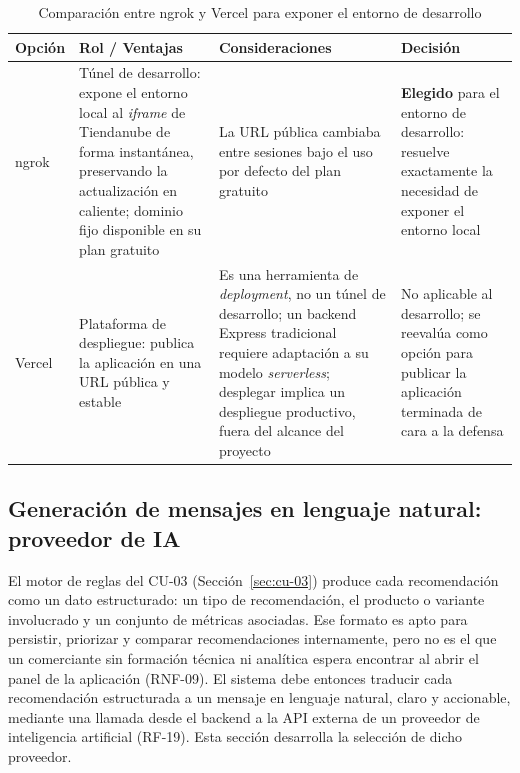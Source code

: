 \begin{table}[h]
\centering
\caption{Comparación entre ngrok y Vercel para exponer el entorno de desarrollo}
\label{tab:comparativo_tunel}
\renewcommand{\arraystretch}{1.3}
\begin{tabular}{|m{2.3cm}|m{4.4cm}|m{4.4cm}|m{3.4cm}|}
\hline
\textbf{Opción} & \textbf{Rol / Ventajas} & \textbf{Consideraciones} & \textbf{Decisión} \\
\hline
ngrok & Túnel de desarrollo: expone el entorno local al \emph{iframe} de Tiendanube de forma instantánea, preservando la actualización en caliente; dominio fijo disponible en su plan gratuito & La URL pública cambiaba entre sesiones bajo el uso por defecto del plan gratuito & \textbf{Elegido} para el entorno de desarrollo: resuelve exactamente la necesidad de exponer el entorno local \\
\hline
Vercel & Plataforma de despliegue: publica la aplicación en una URL pública y estable & Es una herramienta de \emph{deployment}, no un túnel de desarrollo; un backend Express tradicional requiere adaptación a su modelo \emph{serverless}; desplegar implica un despliegue productivo, fuera del alcance del proyecto & No aplicable al desarrollo; se reevalúa como opción para publicar la aplicación terminada de cara a la defensa \\
\hline
\end{tabular}
\end{table}

\subsection{Generación de mensajes en lenguaje natural: proveedor de IA}
\label{sec:generacion-mensajes-ia}

El motor de reglas del CU-03 (Sección~\ref{sec:cu-03}) produce cada recomendación como un dato estructurado: un tipo de recomendación, el producto o variante involucrado y un conjunto de métricas asociadas. Ese formato es apto para persistir, priorizar y comparar recomendaciones internamente, pero no es el que un comerciante sin formación técnica ni analítica espera encontrar al abrir el panel de la aplicación (RNF-09). El sistema debe entonces traducir cada recomendación estructurada a un mensaje en lenguaje natural, claro y accionable, mediante una llamada desde el backend a la API externa de un proveedor de inteligencia artificial (RF-19). Esta sección desarrolla la selección de dicho proveedor.

